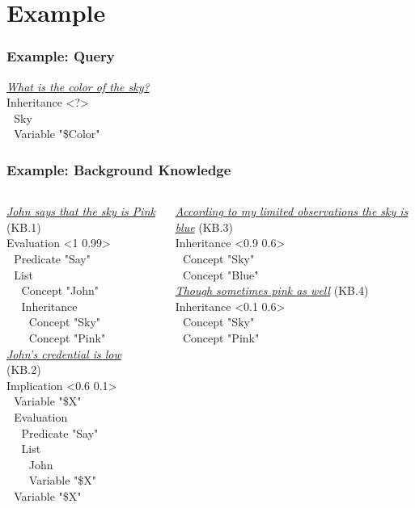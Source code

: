 \documentclass{beamer}
\begin{document}
\section{Example}

\frame
{
  \frametitle{Example: Query}
  
  \underline{\alert{{\it What is the color of the sky?}}}\\[.5cm]

  Inheritance <?>\\
  $\ \ \ $Sky\\
  $\ \ \ $Variable "\$Color"\\
}

\frame
{
  \frametitle{Example: Background Knowledge}

  {\tiny
  \begin{columns}
    \column{1.5in}
    \underline{\alert{{\it John says that the sky is Pink}}} (KB.1)\\[.2cm]
    Evaluation <1 0.99>\\
    $\ \ \ $Predicate "Say"\\
    $\ \ \ $List\\
    $\ \ \ $$\ \ \ $Concept "John"\\
    $\ \ \ $$\ \ \ $Inheritance\\
    $\ \ \ $$\ \ \ $$\ \ \ $Concept "Sky"\\
    $\ \ \ $$\ \ \ $$\ \ \ $Concept "Pink"\\[.5cm]

    \underline{\alert{{\it John's credential is low}}} (KB.2)\\[.2cm]
    Implication <0.6 0.1>\\
    $\ \ \ $Variable "\$X"\\
    $\ \ \ $Evaluation\\
    $\ \ \ $$\ \ \ $Predicate "Say"\\
    $\ \ \ $$\ \ \ $List\\
    $\ \ \ $$\ \ \ $$\ \ \ $John\\
    $\ \ \ $$\ \ \ $$\ \ \ $Variable "\$X"\\
    $\ \ \ $Variable "\$X"\\

    \column{1.5in}

    \underline{\alert{{\it According to my limited observations the sky is
        blue}}} (KB.3)\\[.2cm]
    Inheritance <0.9 0.6>\\
    $\ \ \ $Concept "Sky"\\
    $\ \ \ $Concept "Blue"\\[.5cm]

    \underline{\alert{{\it Though sometimes pink as well}}} (KB.4)\\[.2cm]
    Inheritance <0.1 0.6>\\
    $\ \ \ $Concept "Sky"\\
    $\ \ \ $Concept "Pink"\\[.5cm]

\end{columns}
}
}
\end{document}
